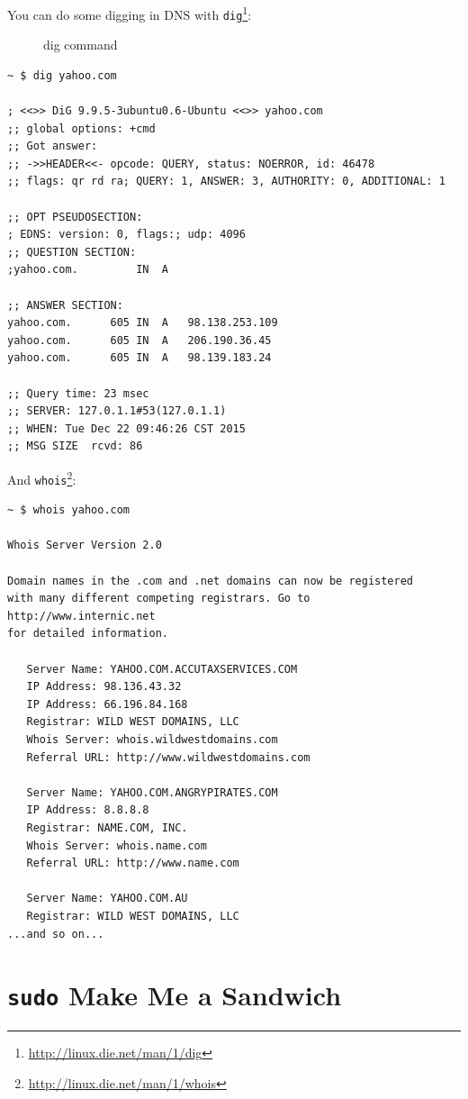 \documentclass[10pt,]{book}
\renewcommand{\href}[2]{#2\footnote{\url{#1}}}
\numberwithin{figure}{chapter}
\DeclareRobustCommand{\drcap}[1]{\begin{figure}[H]\caption{#1}\end{figure}}
\DeclareRobustCommand{\drcmd}[1]{\index{Commands!#1}}
\begin{document}
You can do some digging in DNS with
\href{http://linux.die.net/man/1/dig}{\texttt{dig}}\drcmd{dig}:

\drcap{dig command}

\begin{verbatim}
~ $ dig yahoo.com

; <<>> DiG 9.9.5-3ubuntu0.6-Ubuntu <<>> yahoo.com
;; global options: +cmd
;; Got answer:
;; ->>HEADER<<- opcode: QUERY, status: NOERROR, id: 46478
;; flags: qr rd ra; QUERY: 1, ANSWER: 3, AUTHORITY: 0, ADDITIONAL: 1

;; OPT PSEUDOSECTION:
; EDNS: version: 0, flags:; udp: 4096
;; QUESTION SECTION:
;yahoo.com.         IN  A

;; ANSWER SECTION:
yahoo.com.      605 IN  A   98.138.253.109
yahoo.com.      605 IN  A   206.190.36.45
yahoo.com.      605 IN  A   98.139.183.24

;; Query time: 23 msec
;; SERVER: 127.0.1.1#53(127.0.1.1)
;; WHEN: Tue Dec 22 09:46:26 CST 2015
;; MSG SIZE  rcvd: 86
\end{verbatim}

And
\href{http://linux.die.net/man/1/whois}{\texttt{whois}}\drcmd{whois}:

\begin{verbatim}
~ $ whois yahoo.com

Whois Server Version 2.0

Domain names in the .com and .net domains can now be registered
with many different competing registrars. Go to http://www.internic.net
for detailed information.

   Server Name: YAHOO.COM.ACCUTAXSERVICES.COM
   IP Address: 98.136.43.32
   IP Address: 66.196.84.168
   Registrar: WILD WEST DOMAINS, LLC
   Whois Server: whois.wildwestdomains.com
   Referral URL: http://www.wildwestdomains.com

   Server Name: YAHOO.COM.ANGRYPIRATES.COM
   IP Address: 8.8.8.8
   Registrar: NAME.COM, INC.
   Whois Server: whois.name.com
   Referral URL: http://www.name.com

   Server Name: YAHOO.COM.AU
   Registrar: WILD WEST DOMAINS, LLC
...and so on...
\end{verbatim}

\section*{\texttt{sudo} Make Me a
Sandwich}\label{sudo-make-me-a-sandwich}
\end{document}
